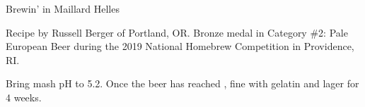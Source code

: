 \stylesection{\stylemunichhelles}

\begin{recipe}{Brewin' in Maillard Helles}

\begin{aboutblock}
Recipe by Russell Berger of Portland, OR. Bronze medal in Category \#2: Pale
European Beer during the 2019 National Homebrew Competition in Providence, RI.
\sourceaha
\end{aboutblock}


\begin{methodandtiming}
 
\begin{mashsteps}
\end{mashsteps}

\begin{fermentationsteps}
\end{fermentationsteps}

\begin{directions}
Bring mash pH to 5.2. Once the beer has reached , fine with
gelatin and lager for 4 weeks.
\end{directions}

\end{methodandtiming}

\recipebreak

\begin{ingredientsblock}

\begin{malts}
\end{malts}

\begin{hops}
\end{hops}


\end{ingredientsblock}

\end{recipe}

